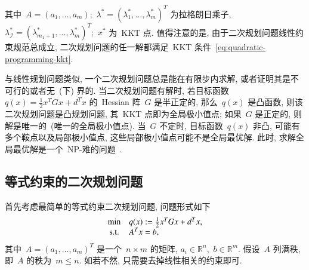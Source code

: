 \documentclass{SBCbookchapter}
\numberwithin{equation}{section}
\begin{document}
其中~$A = ({a}_1, \ldots, {a}_m);$ ${\lambda}^* = (\lambda_1^*, \ldots, \lambda_m^*)^T$ 为拉格朗日乘子, ${\lambda}^*_{\mathcal{I}} = (\lambda_{m_1+1}^*, \ldots, \lambda_m^*)^T;$ ${x}^*$ 为~KKT 点. 值得注意的是, 由于二次规划问题线性约束规范总成立, 二次规划问题的任一解都满足~KKT
条件~\eqref{eq:quadratic-programming-kkt}.

与线性规划问题类似, 一个二次规划问题总是能在有限步内求解, 或者证明其是不可行的或者无~(下) 界的. 当二次规划问题有解时, 若目标函数~$q({x}) = \frac{1}{2} {x}^T G {x} + {d}^T {x}$ 的~Hessian 阵~$G$ 是半正定的, 那么~$q({x})$ 是凸函数, 则该二次规划问题是凸规划问题, 其~KKT 点即为全局极小值点; 如果~$G$ 是正定的, 则解是唯一的~(唯一的全局极小值点). 当~$G$ 不定时, 目标函数~$q({x})$ 非凸, 可能有多个鞍点以及局部极小值点, 这些局部极小值点可能不是全局最优解. 此时, 求解全局最优解是一个~NP-难的问题~\cite{Murty_1987}.


\subsection{等式约束的二次规划问题}
\label{subsec:7.2.1}

首先考虑最简单的等式约束二次规划问题, 问题形式如下
\begin{equation}
\label{eq:quadratic-programming-eq-constrained}
\begin{array}{cl}
\min & q({x}) := \frac{1}{2} {x}^T G {x} + {d}^T {x}, \\
{\rm s.t.} & A^T {x} = {b},
\end{array}
\end{equation}
其中~$A = ({a}_1, \ldots, {a}_m)^T$ 是一个~$n \times m$ 的矩阵, ${a}_i \in \mathbb{R}^n,$ ${b} \in \mathbb{R}^m.$ 假设~$A$ 列满秩, 即~$A$ 的秩为~$m \leqslant n.$ 如若不然, 只需要去掉线性相关的约束即可.
\end{document}
